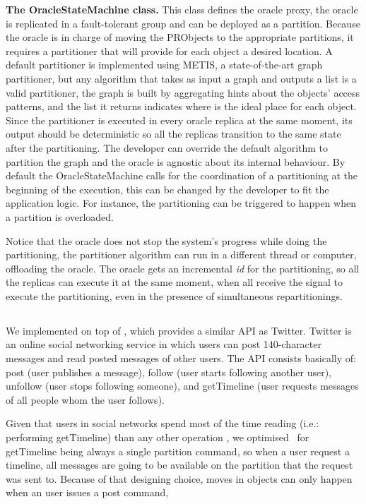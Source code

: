\textbf{The OracleStateMachine class.} This class defines the oracle proxy, the oracle is replicated in a fault-tolerant
group and can be deployed as a partition. Because the oracle is in charge of moving the PRObjects to the appropriate 
partitions, it requires a partitioner that will provide for each object a desired location. A default partitioner is implemented using METIS, a state-of-the-art graph partitioner, but any algorithm that takes as input a graph and outputs a list is a valid
partitioner, the graph is built by aggregating hints about the objects' access patterns, and the list it returns indicates where
is the ideal place for each object. Since the partitioner is executed in every oracle replica at the same moment,
its output should be deterministic so all the replicas transition to the same state after the partitioning. 
The developer can override the default algorithm to partition the graph and the oracle is agnostic about its internal behaviour.
By default the OracleStateMachine calls for the coordination of a partitioning at the beginning of the execution, this can be
changed by the developer to fit the application logic. For instance, the partitioning can be triggered to 
happen when a partition is overloaded.

Notice that the oracle does not stop the system's progress while doing the partitioning, the partitioner algorithm can
 run in a different thread or computer, offloading the oracle. The oracle gets an incremental \emph{id} for the partitioning, 
 so all the replicas can execute it at the same moment, when all receive the signal to execute the partitioning, 
 even in the presence of simultaneous repartitionings.

\subsection{\appname}

We implemented \appname{} on top of \libname{}, which provides a similar API as Twitter. Twitter is an online social networking service in which users can post 140-character messages and read posted messages of other users. The API consists basically of: post (user publishes a message), follow (user starts following another user), unfollow (user stops following someone), and getTimeline (user requests messages of all people whom the user follows).

Given that users in social networks spend most of the time reading (i.e.: performing getTimeline) than any other operation 
\cite{facebookTAO}, we optimised \appname\ for getTimeline being always a single partition command, so when a
user request a timeline, all messages are going to be available on the partition that the request was sent to.
Because of that designing choice, moves in objects can only happen when an user issues a post command,


